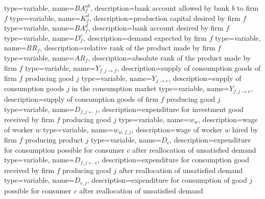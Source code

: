 


{%
  type=variable,%
  name={$BA^{ab}_f$},
  description={bank account allowed by bank $b$ to firm $f$} 
}
{%
  type=variable,%
  name={$K^d_f$},
  description={production capital desired by firm $f$} 
}
{%
  type=variable,%
  name={$BA^d_f$},
  description={bank account desired by firm $f$} 
}
{%
  type=variable,%
  name={$D^e_f$},
  description={demand expected by firm $f$} 
}
{%
  type=variable,%
  name={$RR_f$},
  description={relative rank of the product made by firm $f$} 
}
{%
  type=variable,%
  name={$AR_f$},
  description={absolute rank of the product made by firm $f$} 
}
{%
  type=variable,%
  name={$Y_{f,j\rightarrow f}$},%
  description={supply of consumption goods of firm $f$ producing good $j$} 
}
{%
  type=variable,%
  name={$Y_{j\rightarrow c}$},%
  description={supply of consumption goods $j$ in the consumption market} 
}
{%
  type=variable,%
  name={$Y_{f,j\rightarrow c}$},%
  description={supply of consumption goods of firm $f$ producing good $j$} 
}
{%
  type=variable,%
  name={$D_{f,j\leftarrow f}$},%
  description={expenditure for investment good received by firm $f$ producing good $j$} 
}
{%
  type=variable,%
  name={$w_{w}$},%
  description={wage of worker $w$} 
}
{%
  type=variable,%
  name={$w_{w,f,j}$},%
  description={wage of worker $w$ hired by firm $f$ producing product $j$} 
}
{%
  type=variable,%
  name={$D_{c}$},%
  description={expenditure for consumption possible for consumer $c$ after reallocation of unsatisfied demand} 
}
{%
  type=variable,%
  name={$D_{f,j\leftarrow c}$},%
  description={expenditure for consumption good received by firm $f$ producing good $j$ after reallocation of unsatisfied demand} 
}
{%
  type=variable,%
  name={$D_{c,j}$},%
  description={expenditure for consumption of good $j$ possible for consumer $c$ after reallocation of unsatisfied demand} 
}
